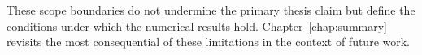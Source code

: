 These scope boundaries do not undermine the primary thesis claim but define
the conditions under which the numerical results hold.
Chapter~\ref{chap:summary} revisits the most consequential of these
limitations in the context of future work.

